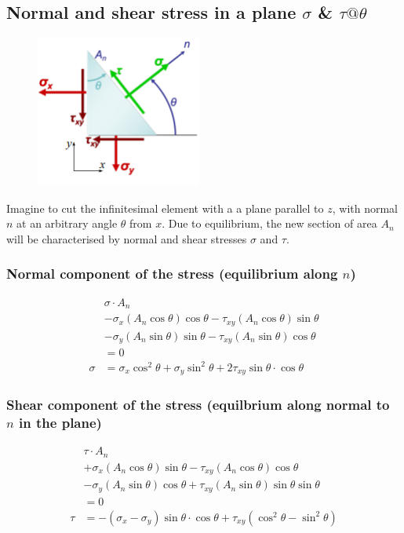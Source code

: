 \documentclass[class=report, crop=false, 12pt,a4paper]{standalone}
\begin{document}
\subsection{Normal and shear stress in a plane $\sigma$ \& $\tau @ \theta$}
\begin{figure}[H]
    \centering
    \includegraphics[height = 5cm]{../img/diagram44.png}
    \caption{}
\end{figure}
Imagine to cut the infinitesimal element with a a plane parallel to $z$, with normal $n$ at an arbitrary angle $\theta$ from $x$. Due to equilibrium, the new section of area $A_n$ will be characterised by normal and shear stresses $\sigma$ and $\tau$. 
\subsubsection{Normal component of the stress (equilibrium along $n$)}
\begin{align}
    &\sigma \cdot A_n\\
    &-\sigma_x \left(A_n \cos \theta\right)\cos\theta - \tau_{xy} \left(A_n\cos\theta\right)\sin\theta\\
    &-\sigma_y \left(A_n\sin\theta\right)\sin\theta - \tau_{xy}\left(A_n\sin\theta\right)\cos\theta\\
    &=0\\
    \sigma &= \sigma_x \cos^2 \theta + \sigma_y \sin^2 \theta + 2\tau_{xy} \sin\theta \cdot \cos\theta
\end{align}
\subsubsection{Shear component of the stress (equilbrium along normal to $n$ in the plane)}
\begin{align}
    &\tau \cdot A_n\\
    &+\sigma_x \left(A_n\cos\theta\right)\sin\theta - \tau_{xy}\left(A_n\cos\theta\right)\cos\theta\\
    &-\sigma_y \left(A_n\sin\theta\right)\cos\theta + \tau_{xy}\left(A_n\sin\theta\right)\sin\theta\sin\theta\\
    &=0\\
    \tau &= - \left(\sigma_x - \sigma_y\right)\sin\theta \cdot \cos\theta + \tau_{xy}\left(\cos^2\theta-\sin^2\theta\right)
\end{align}
\end{document}
